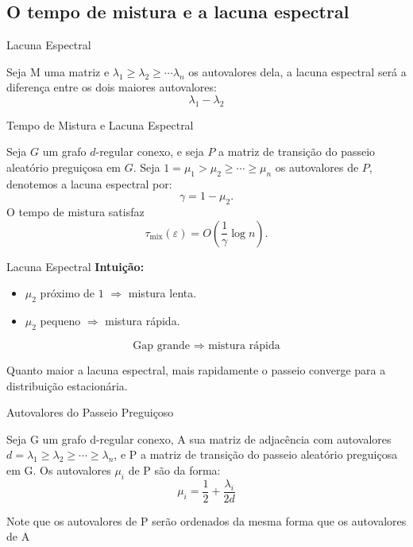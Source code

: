 \subsection{O tempo de mistura e a lacuna espectral}


\begin{frame}{Lacuna Espectral}
  \begin{definition}
    Seja M uma matriz e $\lambda_1\ge\lambda_2\ge\cdots\lambda_n$ os autovalores dela, a lacuna espectral será a diferença entre os dois maiores autovalores:
    \[
      \lambda_1 - \lambda_2
    \]
  \end{definition}
\end{frame}


\begin{frame}{Tempo de Mistura e Lacuna Espectral}
  \begin{theorem}
    \label{thm:spectral_mixing}
    Seja $G$ um grafo $d$-regular conexo, e seja $P$ a matriz de transição do passeio aleatório preguiçosa em $G$. Seja $1=\mu_1>\mu_2\geq \cdots \geq \mu_n$
    os autovalores de $P$, denotemos a lacuna espectral por:
    \[
      \gamma = 1-\mu_2.
    \]
    O tempo de mistura satisfaz
    \[
      \tau_{\mathrm{mix}}(\varepsilon)
      =
      O\!\left(\frac{1}{\gamma}\log n\right).
    \]
  \end{theorem}
\end{frame}

\begin{frame}{Lacuna Espectral}
    \textbf{Intuição:}

    \begin{itemize}
        \item \(\mu_2\) próximo de \(1\) $\Rightarrow$ mistura lenta.
        \item \(\mu_2\) pequeno $\Rightarrow$ mistura rápida.
    \end{itemize}

    \bigskip

    \[
        \boxed{\text{Gap grande } \Rightarrow \text{ mistura rápida}}
    \]
    
    \alert{
        Quanto maior a lacuna espectral,
        mais rapidamente o passeio converge para a distribuição estacionária.
    }


\end{frame}

\begin{frame}{Autovalores do Passeio Preguiçoso}
  \begin{prop}
\label{prop:p_eigenvalues_form}
    Seja G um grafo d-regular conexo, A sua matriz de adjacência com autovalores $d=\lambda_1 \ge \lambda_2 \ge\cdots\ge \lambda_n$, e P a matriz de transição do passeio aleatório preguiçosa em G. Os autovalores $\mu_i$ de P são da forma:
    \[
    \mu_i = \frac12 +\frac{\lambda_i}{2d}
    \]

    Note que os autovalores de P serão ordenados da mesma forma que os autovalores de A
\end{prop}
\end{frame}

